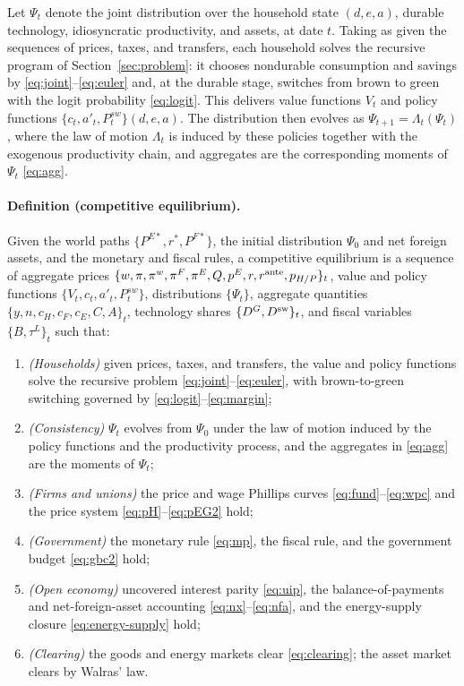 Let $\Psi_t$ denote the joint distribution over the household state
$(d, e, a)$, durable technology, idiosyncratic productivity, and assets, at date
$t$. Taking as given the sequences of prices, taxes, and transfers, each household
solves the recursive program of Section~\ref{sec:problem}: it chooses nondurable
consumption and savings by \eqref{eq:joint}--\eqref{eq:euler} and, at the durable
stage, switches from brown to green with the logit probability \eqref{eq:logit}.
This delivers value functions $V_t$ and policy functions
$\{c_t, a'_t, P^{sw}_t\}(d, e, a)$. The distribution then evolves as
$\Psi_{t+1}=\Lambda_t(\Psi_t)$, where the law of motion $\Lambda_t$ is induced by
these policies together with the exogenous productivity chain, and aggregates are the
corresponding moments of $\Psi_t$ \eqref{eq:agg}.

\paragraph{Definition (competitive equilibrium).}
Given the world paths $\{P^{E*},r^{*},P^{F*}\}$, the initial distribution $\Psi_0$
and net foreign assets, and the monetary and fiscal rules, a competitive equilibrium
is a sequence of aggregate prices
$\{w,\pi,\pi^{w},\pi^{F},\pi^{E},Q,p^{E}, r, r^{\mathrm{ante}},p_{H/P}\}_t$, value and
policy functions $\{V_t, c_t, a'_t, P^{sw}_t\}$, distributions $\{\Psi_t\}$, aggregate
quantities $\{y, n, c_H, c_F, c_E, C, A\}_t$, technology shares $\{D^{G},D^{\mathrm{sw}}\}_t$, and fiscal
variables $\{B,\tau^{L}\}_t$ such that:
\begin{enumerate}[label=(\roman*),leftmargin=2.2em, itemsep=1pt]
\item \emph{(Households)} given prices, taxes, and transfers, the value and policy
functions solve the recursive problem \eqref{eq:joint}--\eqref{eq:euler}, with
brown-to-green switching governed by \eqref{eq:logit}--\eqref{eq:margin};
\item \emph{(Consistency)} $\Psi_t$ evolves from $\Psi_0$ under the law of motion
induced by the policy functions and the productivity process, and the aggregates in
\eqref{eq:agg} are the moments of $\Psi_t$;
\item \emph{(Firms and unions)} the price and wage Phillips curves
\eqref{eq:fund}--\eqref{eq:wpc} and the price system
\eqref{eq:pH}--\eqref{eq:pEG2} hold;
\item \emph{(Government)} the monetary rule \eqref{eq:mp}, the fiscal rule, and the
government budget \eqref{eq:gbc2} hold;
\item \emph{(Open economy)} uncovered interest parity \eqref{eq:uip}, the
balance-of-payments and net-foreign-asset accounting
\eqref{eq:nx}--\eqref{eq:nfa}, and the energy-supply closure
\eqref{eq:energy-supply} hold;
\item \emph{(Clearing)} the goods and energy markets clear \eqref{eq:clearing}; the
asset market clears by Walras' law.
\end{enumerate}

